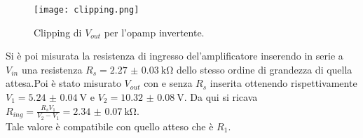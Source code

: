 \begin{figure}[h]
	\centering
	\texttt{[image: clipping.png]}
	\caption{Clipping di $V_{out}$ per l'opamp invertente.}
	\label{f:clipping}
\end{figure}

Si è poi misurata la resistenza di ingresso del'amplificatore inserendo in serie a $V_{in}$ una resistenza $R_s=\SI{2.27(3)}{\kohm}$ dello stesso ordine di grandezza di quella attesa.Poi è stato misurato $V_{out}$ con e senza $R_s$ inserita ottenendo rispettivamente $V_1=\SI{5.24(4)}{\V}$ e $V_2=\SI{10.32(8)}{\V}$. Da qui si ricava \\
$R_{ing}=\frac{R_sV_1}{V_2-V_1}= \SI{2.34(7)}{\kohm}$.\\
Tale valore è compatibile con quello atteso che è $R_1$.